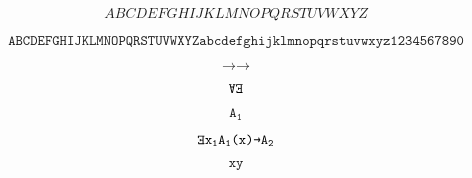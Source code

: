\documentclass[dvipdfmx]{jsarticle}
\newcommand{\textttsub}[2]{\texttt{#1}_{\texttt{#2}}}
\begin{document}
\[
ABCDEFGHIJKLMNOPQRSTUVWXYZ
\]

\[
\texttt{ABCDEFGHIJKLMNOPQRSTUVWXYZ}
\texttt{abcdefghijklmnopqrstuvwxyz}
\texttt{1234567890}
\]

\[
\texttt{→}→
\]

\[
\rotatebox[origin=c]{180}{\texttt{A}}
\rotatebox[origin=c]{180}{\texttt{E}}
\]

\[
\texttt{A}_{\texttt{1}}
\]

\[
\rotatebox[origin=c]{180}{\texttt{E}}\textttsub{x}{1}\textttsub{A}{1}\texttt{(x)}\texttt{→}\textttsub{A}{2}
\]

\[
\texttt{xy}
\]
\end{document}
